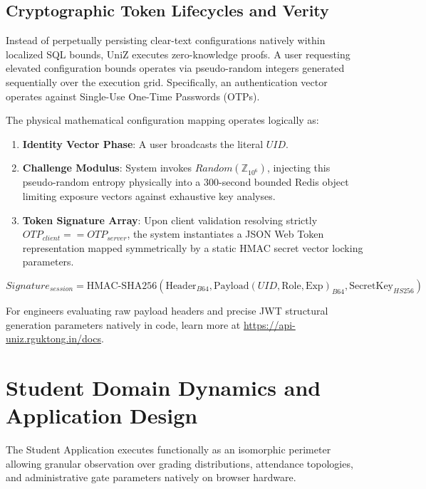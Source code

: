 \documentclass[journal,onecolumn,10pt,draftclsnofoot]{IEEEtran}
\begin{document}
\subsection{Cryptographic Token Lifecycles and Verity}
Instead of perpetually persisting clear-text configurations natively within localized SQL bounds, UniZ executes zero-knowledge proofs. A user requesting elevated configuration bounds operates via pseudo-random integers generated sequentially over the execution grid. Specifically, an authentication vector operates against Single-Use One-Time Passwords (OTPs).

The physical mathematical configuration mapping operates logically as:
\begin{enumerate}
    \item \textbf{Identity Vector Phase}: A user broadcasts the literal $UID$.
    \item \textbf{Challenge Modulus}: System invokes $Random(\mathbb{Z}_{10^6})$, injecting this pseudo-random entropy physically into a $300$-second bounded Redis object limiting exposure vectors against exhaustive key analyses.
    \item \textbf{Token Signature Array}: Upon client validation resolving strictly $OTP_{client} == OTP_{server}$, the system instantiates a JSON Web Token representation mapped symmetrically by a static HMAC secret vector locking parameters.
\end{enumerate}

\begin{equation}
    Signature_{session} = \text{HMAC-SHA256}(\text{Header}_{B64}, \text{Payload}(UID, \text{Role}, \text{Exp})_{B64}, \text{SecretKey}_{HS256})
\end{equation}

For engineers evaluating raw payload headers and precise JWT structural generation parameters natively in code, learn more at \url{https://api-uniz.rguktong.in/docs}.

\newpage

\section{Student Domain Dynamics and Application Design}

The Student Application executes functionally as an isomorphic perimeter allowing granular observation over grading distributions, attendance topologies, and administrative gate parameters natively on browser hardware.
\end{document}
